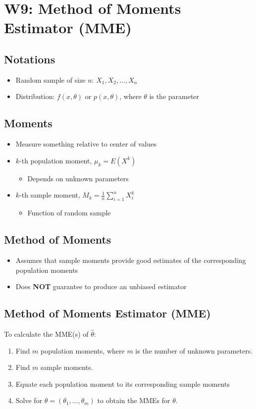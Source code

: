 \documentclass[a4paper]{article}
\begin{document}
\section{W9: Method of Moments Estimator (MME)}
\subsection{Notations}
\begin{itemize}
    \item Random sample of size $n$: $X_{1}, X_{2}, \ldots , X_{n}$
    \item Distribution: $f(x, \theta)$ or $p(x, \theta)$, where $\theta$ is the parameter
\end{itemize}
\subsection{Moments}
\begin{itemize}
    \item Measure something relative to center of values
    \item $k$-th population moment, $\mu_{k} = E(X^k)$
    \begin{itemize}[label=$\circ$]
        \item Depends on unknown parameters
    \end{itemize}
    \item $k$-th sample moment, $\displaystyle M_{k} = \frac{1}{n}\sum_{i=1}^{n}X_{i}^{k}$
    \begin{itemize}[label=$\circ$]
        \item Function of random sample
    \end{itemize}
\end{itemize}
\subsection{Method of Moments}
\begin{itemize}
    \item Assumes that sample moments provide good estimates of the corresponding population moments
    \item Does \textbf{NOT} guarantee to produce an unbiased estimator
\end{itemize}
\subsection{Method of Moments Estimator (MME)}
To calculate the MME(s) of $\hat{\theta}$:
\begin{enumerate}
    \item Find $m$ population moments, where $m$ is the number of unknown parameters.
    \item Find $m$ sample moments.
    \item Equate each population moment to its corresponding sample moments
    \item Solve for $\theta = (\theta_{1}, \ldots, \theta_{m})$ to obtain the MMEs for $\theta$.
\end{enumerate}
\newpage
\end{document}

